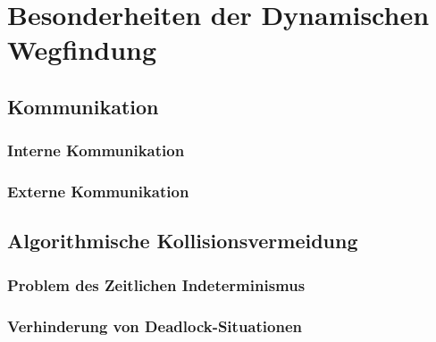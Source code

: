 \chapter{Besonderheiten der Dynamischen Wegfindung}

\section{Kommunikation}

\subsection{Interne Kommunikation}

\subsection{Externe Kommunikation}

\section{Algorithmische Kollisionsvermeidung}

\subsection{Problem des Zeitlichen Indeterminismus}

\subsection{Verhinderung von Deadlock-Situationen}

